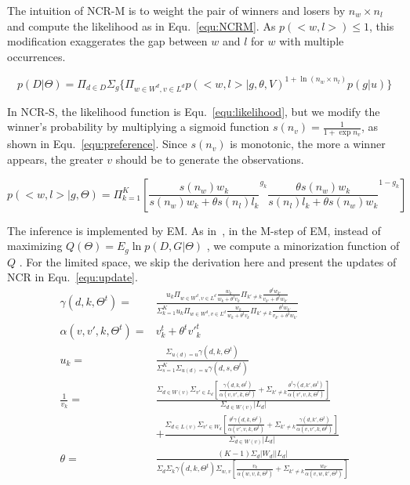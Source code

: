 \documentclass[sigconf]{acmart}
\begin{document}
The intuition of NCR-M is to weight the pair of winners and losers  by  $n_w \times n_l $  and compute the likelihood as in Equ.~\ref{equ:NCRM}. As $p(<w,l>) \leq 1$, this modification exaggerates the gap between $w$ and $l$ for $w$ with multiple occurrences. 

\begin{equation}\label{equ:NCRM}
		p(D|\Theta)=\Pi_{d\in D} \Sigma_{g} \{ \Pi_{w\in W^d, v\in L^d} {p(<w,l>|g,\theta,V)}^{1+\ln (n_w \times n_l)} p(g|u) \}
\end{equation}

In NCR-S, the likelihood function is Equ.~\ref{equ:likelihood}, but we modify the winner's probability by multiplying a sigmoid function $s(n_v)=\frac{1}{1+\exp n_v}$, as shown in Equ.~\ref{equ:preference}. Since $s(n_v)$ is monotonic, the more a winner appears, the greater $v$ should be to generate the observations. 

\begin{equation}\label{equ:preference}
 p(<w,l>|g,\Theta)  =  \Pi_{k=1}^{K}[ {\frac{s(n_w) w_k}{s(n_w) w_k+\theta s(n_l) l_k}}^{g_k} { \frac{\theta s(n_w) w_{k}}{s(n_l) l_{k}+\theta s(n_w) w_{k}}}^{1-g_k}]
\end{equation}


The inference is implemented by EM. As in~\cite{Hunter2004MM}, in the M-step of EM, instead of maximizing $Q(\Theta)=E_g \ln p(D,G|\Theta) $ , we compute a minorization function of $Q$ . For the limited space, we skip the derivation here and present the updates of NCR in Equ.~\ref{equ:update}. 
\begin{align}\label{equ:update}
\gamma(d,k,\Theta^t) =&\frac{u_k \Pi_{w \in W^d, v\in L^d} \frac{w_k}{w_k+\theta^t v_k}\Pi_{k'\neq k}\frac{\theta^t w_{k'}}{v_{k'}+\theta^t w_{k'}}}{\Sigma_{k=1}^K u_k \Pi_{w \in W^d, v\in L^d} \frac{w_k}{w_k+\theta^t v_k}\Pi_{k'\neq k}\frac{\theta^t w_{k'}}{v_{k'}+\theta^t w_{k'}}}\\\nonumber
\alpha(v,v',k,\Theta^t)=&v_k^t + \theta^t {v'}_k^t\\\nonumber
u_k = & \frac{\Sigma_{u(d)=u}\gamma(d,k,\Theta^t)}{\Sigma_{s=1}^K \Sigma_{u(d)=u}\gamma(d,s,\Theta^t)} \\\nonumber
\frac{1}{v_k}= &\frac{\Sigma_{d\in W(v)}\Sigma_{v'\in L_d} [\frac{\gamma(d,k,\Theta^t)}{ \alpha(v,v',k,\Theta^t)} +\Sigma_{k'\neq k}\frac{\theta^t\gamma(d,k',\Theta^t)}{\alpha(v',v,k,\Theta^t)}]}{\Sigma_{d\in W(v)}|L_d|}\\\nonumber
 & + \frac{\Sigma_{d\in L(v)}\Sigma_{v'\in W_d} [\frac{\theta^t \gamma(d,k,\Theta^t)}{\alpha(v',v,k,\Theta^t)}+\Sigma_{k'\neq k} \frac{\gamma(d,k',\Theta^t)}{\alpha(v,v',k,\Theta^t)}] }{\Sigma_{d\in W(v)}|L_d|}\\\nonumber
\theta = & \frac{(K-1)\Sigma_d |W_d| |L_d|}{\Sigma_d \Sigma_k \gamma(d,k,\Theta^t)\Sigma_{w,v} [\frac{v_k}{\alpha(w,v,k,\Theta^t)}+\Sigma_{k'\neq k} \frac{w_{k'}}{\alpha(v,w,k',\Theta^t)}]}
\end{align}
\end{document}
